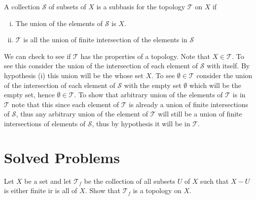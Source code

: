 \begin{definition}
	A collection $ \mathcal{S} $ of subsets of $ X $ is a subbasis for the topology $ \mathcal{T} $ on $ X $ if
	\begin{enumerate}[(i),noitemsep]
		\item The union of the elements of $ \mathcal{S} $ is $ X $.
		\item $ \mathcal{T} $ is all the union of finite intersection of the elements in $ \mathcal{S} $
	\end{enumerate}
\end{definition}
\begin{remark}
	We can check to see if $ \mathcal{T} $ has the properties of a topology. Note that $ X \in \mathcal{T} $. To see this consider the union of the intersection of each element of $ \mathcal{S} $ with itself. By hypothesis (i) this union will be the whose set $ X $. To see $ \emptyset \in \mathcal{T} $ consider the union of the intersection of each element of $ \mathcal{S} $ with the empty set $ \emptyset $ which will be the empty set, hence $ \emptyset \in \mathcal{T} $. To show that arbitrary union of the elements of $ \mathcal{T} $ is in $ \mathcal{T} $ note that this since each element of $ \mathcal{T} $ is already a union of finite intersections of $ \mathcal{S} $, thus any arbitrary union of the element of $ \mathcal{T} $ will still be a union of finite intersections of elements of $ \mathcal{S} $, thus by hypothesis it will be in $ \mathcal{T} $.
\end{remark}










\section{Solved Problems}


\begin{problem}
	Let $ X $ be a set and let $ \mathcal{T}_f $ be the collection of all subsets $ U $ of $ X $ such that $ X - U $ is either finite ir is all of $ X $. Show that $ \mathcal{T}_f $ is a topology on $ X $.
\end{problem}

